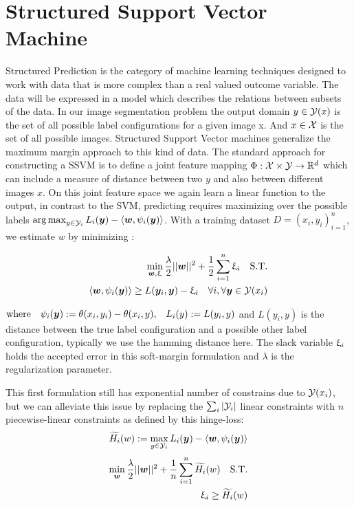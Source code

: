 \section{Structured Support Vector Machine } \label{ssvm}
Structured Prediction is the category of machine learning techniques designed to work with data that is more complex than a real valued outcome variable. The data will be expressed in a model which describes the relations between subsets of the data. In our image segmentation problem the output domain $y \in \mathcal{Y}(x)$ is the set of all possible label configurations for a given image x. And $x \in \mathcal{X}$ is the set of all possible images. Structured Support Vector machines generalize the maximum margin approach to this kind of data. The standard approach for constructing a SSVM is to define a joint feature mapping $\Phi : \mathcal{X} \times \mathcal{Y} \rightarrow \mathbb{R}^d $ which can include a measure of distance between two $y$ and also between different images $x$. On this joint feature space we again learn a linear function to the output, in contrast to the SVM, predicting requires maximizing over the possible labels $ \operatorname*{arg\,max}_{y \in \mathcal{Y}_i} L_i(\bm{y})-\langle \bm{w}, \psi_i(\bm{y}) \rangle  $. With a training dataset $D = { (x_i,y_i)}^n_{i=1}$, we estimate $w$ by minimizing : 

 \begin{align}
 \min_{\bm{w},\upxi} \frac{\lambda}{2}||\bm{w}||^2 + \frac{1}{2}\sum^n_{i=1}\upxi_i \label{optimizationFunc}  \quad  \text{S.T.}\\
\langle \bm{w},\psi_i(\bm{y}) \rangle \geq L(\bm{y}_i,\bm{y}) - \upxi_i \quad \forall i, \forall \bm{y} \in \mathcal{Y}(x_i) 
\end{align}

$ \textnormal{where} \quad \psi_i(\bm{y}) := \theta(x_i,y_i) - \theta(x_i,y) \textnormal{,} \quad L_i(y) := L(y_i,y) $ and $L(y_i,y)$ is the distance between the true label configuration and a possible other label configuration, typically we use the hamming distance here. The slack variable $\upxi_i$ holds the accepted error in this soft-margin formulation and $\lambda$ is the regularization parameter. 

This first formulation still has exponential number of constrains due to $\mathcal{Y}(x_i) $, but we can alleviate this issue by replacing the $\sum_{i} | \mathcal{Y}_i |$ linear constraints with $n$ piecewise-linear constraints as defined by this hinge-loss: 
\begin{align} \label{eq:maxOracle}
\widetilde{H_i}(w) := \max_{y \in \mathcal{Y}_i} L_i(\bm{y}) - \langle \bm{w}, \psi_i(\bm{y}) \rangle
\end{align}
\begin{align}
 \min_{\bm{w}} \frac{\lambda}{2}||\bm{w}||^2 + \frac{1}{n}\sum^n_{i=1} \widetilde{H_i}(w) \label{optimizationFunc} \quad  \text{S.T.}\\
  \upxi_i \geq \widetilde{H_i}(w)
\end{align}

